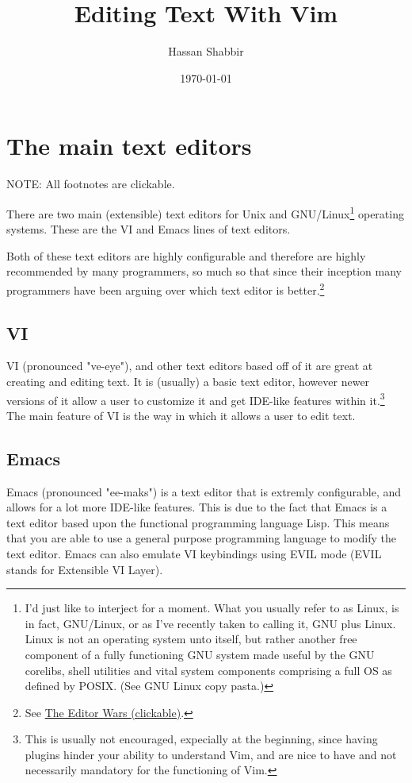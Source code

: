 \documentclass[11pt]{article}
\author{Hassan Shabbir}
\date{\today}
\title{Editing Text With Vim}
\begin{document}
\maketitle
\tableofcontents

\newpage
\section{The main text editors}
\label{sec:orgc1559db}
NOTE: All footnotes are clickable.

There are two main (extensible) text editors for Unix and GNU/Linux\footnote{I'd just like to interject for a moment. What you usually refer to as Linux, is
in fact, GNU/Linux, or as I've recently taken to calling it, GNU plus Linux.
Linux is not an operating system unto itself, but rather another free component
of a fully functioning GNU system made useful by the GNU corelibs, shell
utilities and vital system components comprising a full OS as defined by POSIX.
(See GNU Linux copy pasta.)}
operating systems. These are the VI and Emacs lines of text editors.

Both of these text editors are highly configurable and therefore are highly
recommended by many programmers, so much so that since their inception many
programmers have been arguing over which text editor is better.\footnote{See \href{https://en.wikipedia.org/wiki/Editor\_war}{The Editor Wars (clickable)}.}
\subsection{VI}
\label{sec:org4287a1b}
VI (pronounced "ve-eye"), and other text editors based off of it are great at
creating and editing text. It is (usually) a basic text editor, however newer
versions of it allow a user to customize it and get IDE-like features within
it.\footnote{This is usually not encouraged, expecially at the beginning, since
having plugins hinder your ability to understand Vim, and are nice to have
and not necessarily mandatory for the functioning of Vim.} The main feature of VI is the way in which it allows a user to edit
text.
\subsection{Emacs}
\label{sec:orgc24404a}
Emacs (pronounced "ee-maks") is a text editor that is extremly configurable, and
allows for a lot more IDE-like features. This is due to the fact that Emacs is a
text editor based upon the functional programming language Lisp. This means that
you are able to use a general purpose programming language to modify the text
editor. Emacs can also emulate VI keybindings using EVIL mode (EVIL stands for
Extensible VI Layer).
\end{document}
